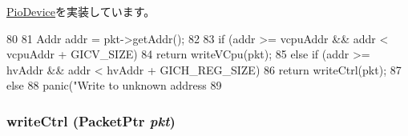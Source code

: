 \hyperlink{classPioDevice_afe8371668d023bb2516b286e5e399b6f}{PioDevice}を実装しています。


\begin{DoxyCode}
80 {
81     Addr addr = pkt->getAddr();
82 
83     if (addr >= vcpuAddr && addr < vcpuAddr + GICV_SIZE)
84         return writeVCpu(pkt);
85     else if (addr >= hvAddr && addr < hvAddr + GICH_REG_SIZE)
86         return writeCtrl(pkt);
87     else
88         panic("Write to unknown address %
89 }
\end{DoxyCode}
\hypertarget{classVGic_ab75ecb383e0dfa786c92077803100348}{
\subsubsection[{writeCtrl}]{ writeCtrl ({\bf PacketPtr} {\em pkt})}}
\label{classVGic_ab75ecb383e0dfa786c92077803100348}




